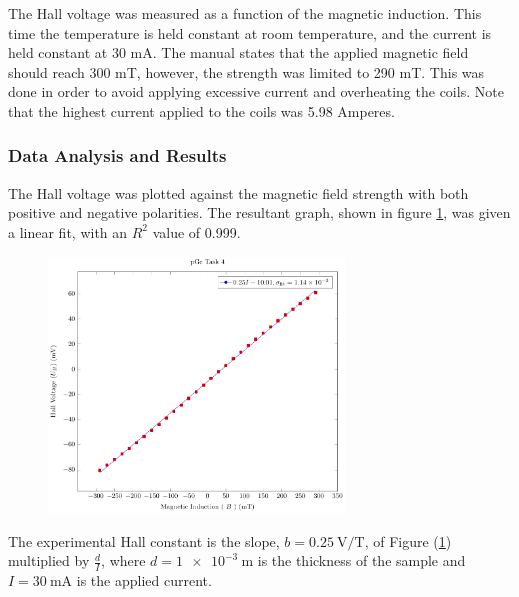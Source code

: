 \documentclass[a4paper]{article}
\begin{document}
\qq The Hall voltage was measured as a function of the magnetic
induction. This time the temperature is held constant at room
temperature, and the current is held constant at 30 mA. The manual
states that the applied magnetic field should reach 300 mT,
however, the strength was limited to 290 mT. This was done in
order to avoid applying excessive current and overheating the coils. 
Note that the highest current applied to the coils was 5.98
Amperes.

\subsubsection{Data Analysis and Results}
\qq The Hall voltage was plotted against the magnetic field strength
with both positive and negative polarities. The resultant graph, shown
in figure \ref{task24plot}, was given a linear fit, with an $R^2$
value of 0.999.

\begin{figure}[H]
\centering
\includegraphics[width=0.7\textwidth]{PGePlots/Task4/pGeTask4.pdf}
\label{task24plot}
\end{figure}

\qq The experimental Hall constant is the slope, \( b =
\SI{0.25}{\volt\per\tesla} \), of Figure (\ref{task24plot})
multiplied by \( \frac{d}{I} \), where \( d = \SI{1e-3}{\meter} \) is the
thickness of the sample and \( I = \SI{30}{\milli\ampere} \) is the applied
current. 
\end{document}
